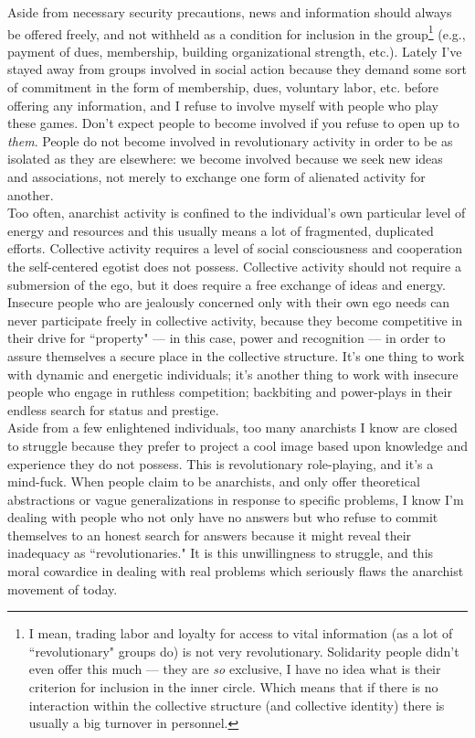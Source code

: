 Aside from necessary security precautions, news and information should always be offered freely, and not withheld as a condition for inclusion in the group\footnote{I mean, trading labor and loyalty for access to vital information (as a lot of ``revolutionary" groups do) is not very revolutionary. Solidarity people didn't even offer this much --- they are \emph{so} exclusive, I have no idea what is their criterion for inclusion in the inner circle. Which means that if there is no interaction within the collective structure (and collective identity) there is usually a big turnover in personnel.} (e.g., payment of dues, membership, building organizational strength, etc.). Lately I've stayed away from groups involved in social action because they demand some sort of commitment in the form of membership, dues, voluntary labor, etc. before offering any information, and I refuse to involve myself with people who play these games. Don't expect people to become involved if you refuse to open up to \emph{them}. People do not become involved in revolutionary activity in order to be as isolated as they are elsewhere: we become involved because we seek new ideas and associations, not merely to exchange one form of alienated activity for another.\\
Too often, anarchist activity is confined to the individual's own particular level of energy and resources and this usually means a lot of fragmented, duplicated efforts. Collective activity requires a level of social consciousness and cooperation the self-centered egotist does not possess. Collective activity should not require a submersion of the ego, but it does require a free exchange of ideas and energy. Insecure people who are jealously concerned only with their own ego needs can never participate freely in collective activity, because they become competitive in their drive for ``property" --- in this case, power and recognition --- in order to assure themselves a secure place in the collective structure. It's one thing to work with dynamic and energetic individuals; it's another thing to work with insecure people who engage in ruthless competition; backbiting and power-plays in their endless search for status and prestige.\\
Aside from a few enlightened individuals, too many anarchists I know are closed to struggle because they prefer to project a cool image based upon knowledge and experience they do not possess. This is revolutionary role-playing, and it's a mind-fuck. When people claim to be anarchists, and only offer theoretical abstractions or vague generalizations in response to specific problems, I know I'm dealing with people who not only have no answers but who refuse to commit themselves to an honest search for answers because it might reveal their inadequacy as ``revolutionaries." It is this unwillingness to struggle, and this moral cowardice in dealing with real problems which seriously flaws the anarchist movement of today.\\
